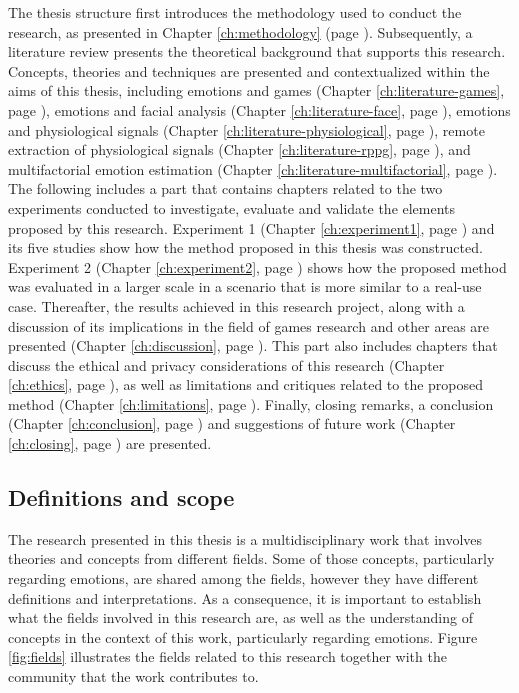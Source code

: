 The thesis structure first introduces the methodology used to conduct the research, as presented in Chapter \ref{ch:methodology} (page \pageref{ch:methodology}). Subsequently, a literature review presents the theoretical background that supports this research. Concepts, theories and techniques are presented and contextualized within the aims of this thesis, including emotions and games (Chapter \ref{ch:literature-games}, page \pageref{ch:literature-games}), emotions and facial analysis (Chapter \ref{ch:literature-face}, page \pageref{ch:literature-face}), emotions and physiological signals (Chapter \ref{ch:literature-physiological}, page \pageref{ch:literature-physiological}), remote extraction of physiological signals (Chapter \ref{ch:literature-rppg}, page \pageref{ch:literature-rppg}), and multifactorial emotion estimation (Chapter \ref{ch:literature-multifactorial}, page \pageref{ch:literature-multifactorial}). The following includes a part that contains chapters related to the two experiments conducted to investigate, evaluate and validate the elements proposed by this research. Experiment 1 (Chapter \ref{ch:experiment1}, page \pageref{ch:experiment1}) and its five studies show how the method proposed in this thesis was constructed. Experiment 2 (Chapter \ref{ch:experiment2}, page \pageref{ch:experiment2}) shows how the proposed method was evaluated in a larger scale in a scenario that is more similar to a real-use case. Thereafter, the results achieved in this research project, along with a discussion of its implications in the field of games research and other areas are presented (Chapter \ref{ch:discussion}, page \pageref{ch:discussion}). This part also includes chapters that discuss the ethical and privacy considerations of this research (Chapter \ref{ch:ethics}, page \pageref{ch:ethics}), as well as limitations and critiques related to the proposed method (Chapter \ref{ch:limitations}, page \pageref{ch:limitations}). Finally, closing remarks, a conclusion (Chapter \ref{ch:conclusion}, page \pageref{ch:conclusion}) and suggestions of future work (Chapter \ref{ch:closing}, page \pageref{ch:closing}) are presented.

\subsection{Definitions and scope}

The research presented in this thesis is a multidisciplinary work that involves theories and concepts from different fields. Some of those concepts, particularly regarding emotions, are shared among the fields, however they have different definitions and interpretations. As a consequence, it is important to establish what the fields involved in this research are, as well as the understanding of concepts in the context of this work, particularly regarding emotions. Figure \ref{fig:fields} illustrates the fields related to this research together with the community that the work contributes to.

